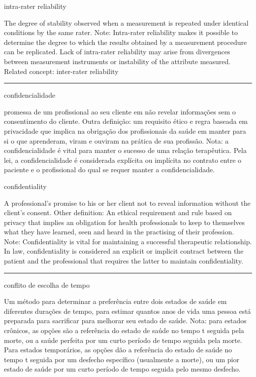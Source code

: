 \documentclass[
  openany]{book}
\begin{document}
intra-rater reliability

The degree of stability observed when a measurement is repeated under identical conditions by the same rater. Note: Intra-rater reliability makes it possible to determine the degree to which the results obtained by a measurement procedure can be replicated. Lack of intra-rater reliability may arise from divergences between measurement instruments or instability of the attribute measured. Related concept: inter-rater reliability

\begin{center}\rule{0.5\linewidth}{0.5pt}\end{center}

confidencialidade

promessa de um profissional ao seu cliente em não revelar informações sem o consentimento do cliente. Outra definição: um requisito ético e regra baseada em privacidade que implica na obrigação dos profissionais da saúde em manter para si o que aprenderam, viram e ouviram na prática de sua profissão. Nota: a confidencialidade é vital para manter o sucesso de uma relação terapêutica. Pela lei, a confidencialidade é considerada explícita ou implícita no contrato entre o paciente e o profissional do qual se requer manter a confidencialidade.

confidentiality

A professional's promise to his or her client not to reveal information without the client's consent. Other definition: An ethical requirement and rule based on privacy that implies an obligation for health professionals to keep to themselves what they have learned, seen and heard in the practising of their profession. Note: Confidentiality is vital for maintaining a successful therapeutic relationship. In law, confidentiality is considered an explicit or implicit contract between the patient and the professional that requires the latter to maintain confidentiality.

\begin{center}\rule{0.5\linewidth}{0.5pt}\end{center}

conflito de escolha de tempo

Um método para determinar a preferência entre dois estados de saúde em diferentes durações de tempo, para estimar quantos anos de vida uma pessoa está preparada para sacrificar para melhorar seu estado de saúde. Nota: para estados crônicos, as opções são a referência do estado de saúde no tempo t seguida pela morte, ou a saúde perfeita por um curto período de tempo seguida pela morte. Para estados temporários, as opções dão a referência do estado de saúde no tempo t seguida por um desfecho específico (usualmente a morte), ou um pior estado de saúde por um curto período de tempo seguida pelo mesmo desfecho.
\end{document}
